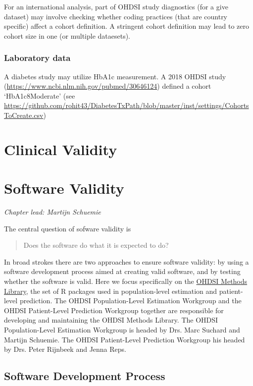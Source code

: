 \documentclass[11pt]{book}
\begin{document}
For an international analysis, part of OHDSI study diagnostics (for a
give dataset) may involve checking whether coding practices (that are
country specific) affect a cohort definition. A stringent cohort
definition may lead to zero cohort size in one (or multiple dataesets).

\subsection{Laboratory data}\label{laboratory-data}

A diabetes study may utilize HbA1c measurement. A 2018 OHDSI study
(\url{https://www.ncbi.nlm.nih.gov/pubmed/30646124}) defined a cohort
`HbA1c8Moderate' (see
\url{https://github.com/rohit43/DiabetesTxPath/blob/master/inst/settings/CohortsToCreate.csv})

\chapter{Clinical Validity}\label{ClinicalValidity}

\chapter{Software Validity}\label{SoftwareValidity}

\emph{Chapter lead: Martijn Schuemie}

The central question of sofware validity is

\begin{quote}
Does the software do what it is expected to do?
\end{quote}

In broad strokes there are two approaches to ensure software validity:
by using a software development process aimed at creating valid
software, and by testing whether the software is valid. Here we focus
specifically on the \href{https://ohdsi.github.io/MethodsLibrary/}{OHDSI
Methods Library}, the set of R packages used in population-level
estimation and patient-level prediction. The OHDSI Population-Level
Estimation Workgroup and the OHDSI Patient-Level Prediction Workgroup
together are responsible for developing and maintaining the OHDSI
Methods Library. The OHDSI Population-Level Estimation Workgroup is
headed by Drs. Marc Suchard and Martijn Schuemie. The OHDSI
Patient-Level Prediction Workgroup his headed by Drs. Peter Rijnbeek and
Jenna Reps.

\section{Software Development
Process}\label{software-development-process}
\end{document}
